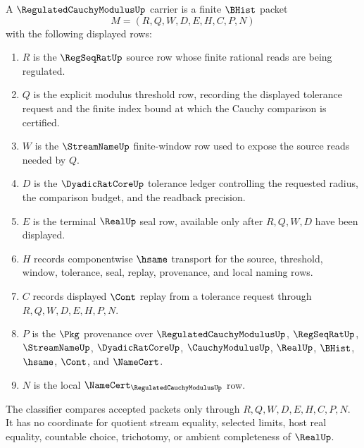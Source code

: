 \begin{definition}
\label{def:regulated-cauchy-modulus-carrier}
A $\RegulatedCauchyModulusUp$ carrier is a finite $\BHist$ packet
$$
M=(R,Q,W,D,E,H,C,P,N)
$$
with the following displayed rows:
\begin{enumerate}
\item $R$ is the $\RegSeqRatUp$ source row whose finite rational reads are being regulated.
\item $Q$ is the explicit modulus threshold row, recording the displayed tolerance request and the finite index bound at which the Cauchy comparison is certified.
\item $W$ is the $\StreamNameUp$ finite-window row used to expose the source reads needed by $Q$.
\item $D$ is the $\DyadicRatCoreUp$ tolerance ledger controlling the requested radius, the comparison budget, and the readback precision.
\item $E$ is the terminal $\RealUp$ seal row, available only after $R,Q,W,D$ have been displayed.
\item $H$ records componentwise $\hsame$ transport for the source, threshold, window, tolerance, seal, replay, provenance, and local naming rows.
\item $C$ records displayed $\Cont$ replay from a tolerance request through $R,Q,W,D,E,H,P,N$.
\item $P$ is the $\Pkg$ provenance over $\RegulatedCauchyModulusUp$, $\RegSeqRatUp$, $\StreamNameUp$, $\DyadicRatCoreUp$, $\CauchyModulusUp$, $\RealUp$, $\BHist$, $\hsame$, $\Cont$, and $\NameCert$.
\item $N$ is the local $\NameCert_{\RegulatedCauchyModulusUp}$ row.
\end{enumerate}
The classifier compares accepted packets only through $R,Q,W,D,E,H,C,P,N$. It has no coordinate for quotient stream equality, selected limits, host real equality, countable choice, trichotomy, or ambient completeness of $\RealUp$.
\end{definition}

